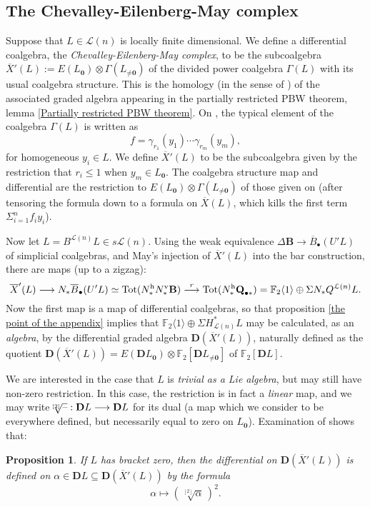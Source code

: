 \documentclass[11pt]{amsart}
\theoremstyle{plain}
\newtheorem{prop}[thm]{Proposition}
\theoremstyle{definition}
\newcommand{\DASH}{\textup{--}}
\renewcommand{\to}{\longrightarrow}
\newcommand{\calL}{\mathcal{L}}
\theoremstyle{plain}
\newcommand{\dualrestn}[1]{\sqrt[{[2]}]{#1}}
\renewcommand{\dualrestn}[1]{\sqrt[{\!\!\![2]}]{#1}}
\newcommand{\UEA}{U'}%
\newcommand{\UEAX}{\overline{X}'}%
\newcommand{\F}{\mathbb{F}}
\newcommand{\Ftwo}{\F_2}
\newcommand{\dual}{\mathbf{D}}
\begin{document}
\begin{appendices}
\subsection{The Chevalley-Eilenberg-May complex}\label{The Chevalley-Eilenberg-May complex}
Suppose that $L\in\calL(n)$ is locally finite dimensional. We define a differential coalgebra, the \emph{Chevalley-Eilenberg-May complex}, to be the subcoalgebra $\UEAX(L):= E(L_{\textbf{0}})\otimes \Gamma(L_{\neq\textbf{0}})$ of the divided power coalgebra $\Gamma(L)$ with its usual coalgebra structure. This is the homology (in the sense of \cite{PriddyKoszul.pdf}) of the associated graded algebra appearing in the partially restricted PBW theorem, lemma \ref{Partially restricted PBW theorem}. On \cite[p.\ 141]{MayRestLie.pdf}, the typical element of the coalgebra $\Gamma(L)$ is written as 
\[f=\gamma_{r_1}(y_1)\cdots \gamma_{r_m}(y_m),\]
for homogeneous $y_i\in L$. We define $\UEAX(L)$ to be the subcoalgebra given by the restriction that $r_i\leq1$ when $y_m\in L_{\textbf{0}}$. The coalgebra structure map and differential are the restriction to $E(L_{\textbf{0}})\otimes \Gamma(L_{\neq\textbf{0}})$ of those given on \cite[p.\ 141]{MayRestLie.pdf} (after tensoring the formula  \cite[(6.19)]{MayRestLie.pdf} down to a formula on $\overline{X}(L)$, which kills the first term $\Sigma_{i=1}^nf_iy_i$).

Now let $ L=B^{\calL(n)}L\in s\calL(n)$. Using the weak equivalence $\Delta\textbf{B}\to \overline{B}_\bullet(\UEA L)$ of simplicial coalgebras, and  May's injection \cite[Theorem 18 and  (7.8)]{MayRestLie.pdf} of $\UEAX(L)$ into the bar construction, there are maps (up to a zigzag):
\[\UEAX(L)\to N_*\overline{B}_\bullet(U'L)\simeq\textup{Tot}(N^\textup{h}_*N^\textup{v}_*\textbf{B})\overset{r}{\to} \textup{Tot}(N^\textup{h}_*\textbf{Q}_{\bullet*})=\Ftwo \langle 1\rangle\oplus \Sigma N_*Q^{\calL(n)} L.\]
Now the first map is a map of differential coalgebras, so that proposition \ref{the point of the appendix} implies that $\Ftwo \langle 1\rangle\oplus \Sigma H^*_{\calL(n)}L$ may be calculated, as an \emph{algebra}, by the differential graded algebra $\dual(\UEAX(L))$, naturally defined as the quotient $\dual(\UEAX(L))=E(\dual L_{\textbf{0}}) \otimes\Ftwo [\dual L_{\neq\textbf{0}}]$ of $\Ftwo [\dual L]$.

We are interested in the case that $L$ is \emph{trivial as a Lie algebra}, but may still have non-zero restriction. In this case, the restriction is in fact a \emph{linear} map, and we may write $\dualrestn{\DASH}:\dual L\to \dual L$ for its dual (a map which we consider to be everywhere defined, but necessarily equal to zero on $L_{\textbf{0}}$). Examination of  \cite[(6.19)]{MayRestLie.pdf} shows that:
\begin{prop}
If $L$ has bracket zero, then the differential on $\dual(\UEAX(L))$ is defined on $\alpha\in \dual L\subseteq \dual(\UEAX(L))$ by the formula
\[\alpha\longmapsto (\!\sqrt[{[2]}]{\alpha}\,)^2.\]


\end{prop}
\end{appendices}
\end{document}

